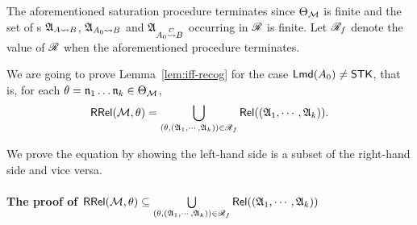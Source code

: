 The aforementioned saturation procedure terminates since $\Theta_{\mathcal{M} }$ is finite and the set of {\NFA}s ${\mathfrak{A} }_{A\rightsquigarrow B}$, ${\mathfrak{A} }_{A_0\rightsquigarrow B}$ and ${\mathfrak{A} }_{A_0\stackrel{C}\rightsquigarrow B}$ occurring in $\mathscr{R}$ is finite.
Let $\mathscr{R}_f$ denote the value of $\mathscr{R}$ when the aforementioned procedure terminates. 

We are going to prove Lemma~\ref{lem:iff-recog} for the case ${\sf Lmd}(A_0) \neq {\sf STK}$, that is, for each $\theta=\mathfrak{n}_1\dots\mathfrak{n}_k\in\Theta_{{\mathcal{M} }}$, 
%
\[\mathsf{RRel}({\mathcal{M} }, \theta) = \bigcup \limits_{(\theta, ({\mathfrak{A} }_1, \cdots, {\mathfrak{A} }_k)) \in \mathscr{R}_f} \mathsf{Rel}(({\mathfrak{A} }_1, \cdots, {\mathfrak{A} }_k)).\]

We prove the equation by showing the left-hand side is a subset of the right-hand side and vice versa. 

\paragraph*{The proof of $\mathsf{RRel}({\mathcal{M} }, \theta) \subseteq \bigcup \limits_{(\theta, ({\mathfrak{A} }_1, \cdots, {\mathfrak{A} }_k)) \in \mathscr{R}_f} \mathsf{Rel}(({\mathfrak{A} }_1, \cdots, {\mathfrak{A} }_k))$}
